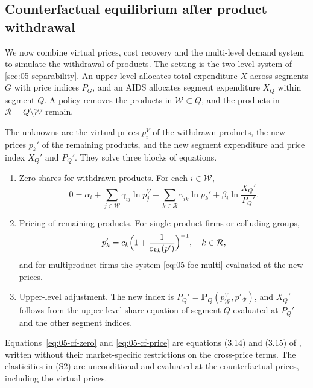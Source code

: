 \subsection{Counterfactual equilibrium after product withdrawal}\label{sec:05-counterfactual}

We now combine virtual prices, cost recovery and the multi-level demand system to simulate the withdrawal of
products. The setting is the two-level system of \cref{sec:05-separability}. An upper level allocates total
expenditure $X$ across segments $G$ with price indices $P_G$, and an AIDS allocates segment expenditure $X_Q$
within segment $Q$. A policy removes the products in $\mathcal{W}\subset Q$, and the products in
$\mathcal{R} = Q\setminus\mathcal{W}$ remain.

The unknowns are the virtual prices $p_i^V$ of the withdrawn products, the new prices $p_k'$ of the remaining
products, and the new segment expenditure and price index $X_Q'$ and $P_Q'$. They solve three blocks of
equations.
\begin{enumerate}[label=(S\arabic*)]
  \item Zero shares for withdrawn products. For each $i\in\mathcal{W}$,
  \begin{equation}\label{eq:05-cf-zero}
    0 = \alpha_i + \sum_{j\in\mathcal{W}}\gamma_{ij}\ln p_j^V + \sum_{k\in\mathcal{R}}\gamma_{ik}\ln p_k'
    + \beta_i\ln\frac{X_Q'}{P_Q'}.
  \end{equation}
  \item Pricing of remaining products. For single-product firms or colluding groups,
  \begin{equation}\label{eq:05-cf-price}
    p_k' = c_k\Bigl(1 + \frac{1}{\varepsilon_{kk}(p')}\Bigr)^{-1}, \quad k\in\mathcal{R},
  \end{equation}
  and for multiproduct firms the system \eqref{eq:05-foc-multi} evaluated at the new prices.
  \item Upper-level adjustment. The new index is $P_Q' = \mathbf{P}_Q(p^V_{\mathcal{W}},p'_{\mathcal{R}})$, and
  $X_Q'$ follows from the upper-level share equation of segment $Q$ evaluated at $P_Q'$ and the other segment
  indices.
\end{enumerate}
Equations~\eqref{eq:05-cf-zero} and \eqref{eq:05-cf-price} are equations (3.14) and (3.15) of \citet{ChaudhuriGoldbergJia2006},
written without their market-specific restrictions on the cross-price terms. The elasticities in (S2) are
unconditional and evaluated at the counterfactual prices, including the virtual prices.

